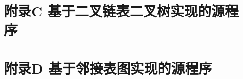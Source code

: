 \documentclass[supercite]{Experimental_Report}
\theoremstyle{definition}
\begin{document}
%
%
%







\newpage



\section{附录C 基于二叉链表二叉树实现的源程序}
\newpage


\section{附录D 基于邻接表图实现的源程序}
\end{document}
